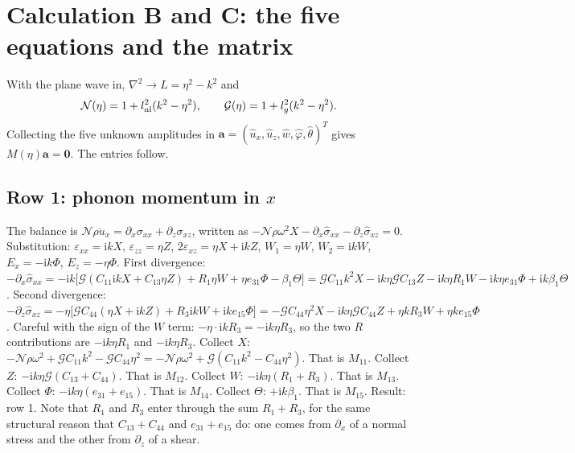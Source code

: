 \documentclass[11pt]{article}
\makeatletter
\newif\ifshowworked
\newenvironment{worked}{%
  \ifshowworked\par\smallskip\noindent\textit{Working.}\par\smallskip\else
  \setbox\z@\vbox\bgroup\fi}{\ifshowworked\par\smallskip\else\egroup\fi}
\newcommand{\ii}{\mathrm{i}}
\newcommand{\Ncal}{\mathcal{N}}
\newcommand{\Gcal}{\mathcal{G}}
\makeatother
\begin{document}
\section{Calculation B and C: the five equations and the matrix}\label{sec:calcBC}

With the plane wave in, $\nabla^2\to L=\eta^2-k^2$ and
\begin{equation}
\Ncal(\eta)=1+l_{\rm nl}^2(k^2-\eta^2),\qquad \Gcal(\eta)=1+l_g^2(k^2-\eta^2).
\label{eq:NG}
\end{equation}
Collecting the five unknown amplitudes in $\mathbf a=(\hat u_x,\hat u_z,\hat w,\hat\varphi,\hat\theta)^T$
gives $M(\eta)\mathbf a=\mathbf 0$. The entries follow.

\subsection*{Row 1: phonon momentum in $x$}

\begin{worked}
The balance is $\Ncal\rho\ddot u_x=\partial_x\sigma_{xx}+\partial_z\sigma_{xz}$, written as
$-\Ncal\rho\omega^2X-\partial_x\hat\sigma_{xx}-\partial_z\hat\sigma_{xz}=0$.
Substitution: $\varepsilon_{xx}=\ii kX$, $\varepsilon_{zz}=\eta Z$, $2\varepsilon_{xz}=\eta X+\ii kZ$,
$W_1=\eta W$, $W_2=\ii kW$, $E_x=-\ii k\Phi$, $E_z=-\eta\Phi$.
First divergence: $-\partial_x\hat\sigma_{xx}
=-\ii k\bigl[\Gcal(C_{11}\ii kX+C_{13}\eta Z)+R_1\eta W+\eta e_{31}\Phi-\beta_1\Theta\bigr]
=\Gcal C_{11}k^2X-\ii k\eta\Gcal C_{13}Z-\ii k\eta R_1W-\ii k\eta e_{31}\Phi+\ii k\beta_1\Theta$.
Second divergence: $-\partial_z\hat\sigma_{xz}
=-\eta\bigl[\Gcal C_{44}(\eta X+\ii kZ)+R_3\ii kW+\ii ke_{15}\Phi\bigr]
=-\Gcal C_{44}\eta^2X-\ii k\eta\Gcal C_{44}Z+\eta kR_3W+\eta ke_{15}\Phi$.
Careful with the sign of the $W$ term: $-\eta\cdot\ii kR_3=-\ii k\eta R_3$, so the two $R$ contributions
are $-\ii k\eta R_1$ and $-\ii k\eta R_3$.
Collect $X$: $-\Ncal\rho\omega^2+\Gcal C_{11}k^2-\Gcal C_{44}\eta^2
=-\Ncal\rho\omega^2+\Gcal(C_{11}k^2-C_{44}\eta^2)$. That is $M_{11}$.
Collect $Z$: $-\ii k\eta\Gcal(C_{13}+C_{44})$. That is $M_{12}$.
Collect $W$: $-\ii k\eta(R_1+R_3)$. That is $M_{13}$.
Collect $\Phi$: $-\ii k\eta(e_{31}+e_{15})$. That is $M_{14}$.
Collect $\Theta$: $+\ii k\beta_1$. That is $M_{15}$.
Result: row 1. Note that $R_1$ and $R_3$ enter through the sum $R_1+R_3$, for the same structural reason
that $C_{13}+C_{44}$ and $e_{31}+e_{15}$ do: one comes from $\partial_x$ of a normal stress and the other
from $\partial_z$ of a shear.
\end{worked}
\end{document}

